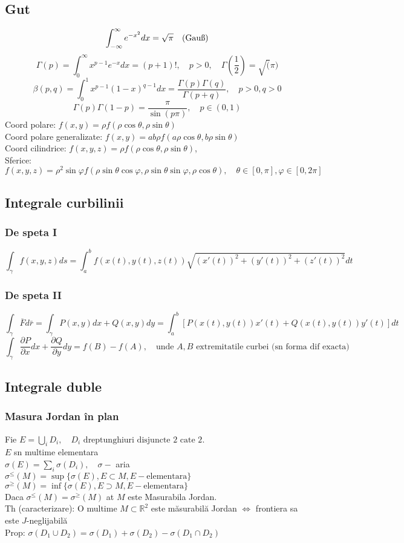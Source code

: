 \documentclass{article}
\newcommand{\parti}[2]{\frac{\partial #1}{ \partial #2}}
\newcommand*{\R}{\mathbb{R}}
\begin{document}
\subsection*{Gut}
\[ \int_{-\infty}^{\infty}e^{-x^2}dx = \sqrt{\pi} \text{\quad(Gauß)} \]
\[ \Gamma(p) = \int_0^{\infty} x^{p-1}e^{-x}dx = (p+1)!, \quad p > 0, \quad \Gamma(\frac{1}{2}) = \sqrt(\pi)  \]
\[ \beta(p, q) = \int_0^{1} x^{p-1}(1-x)^{q-1}dx = \frac{\Gamma(p)\Gamma(q)}{\Gamma(p+q)}, \quad p > 0, q > 0 \]
\[ \Gamma(p)\Gamma(1-p)= \frac{\pi}{\sin(p\pi)}, \quad p \in (0, 1) \]
Coord polare: $f(x,y) = \rho f(\rho \cos \theta, \rho \sin\theta)$ \\
Coord polare generalizate: $f(x,y) = ab\rho f(a\rho\cos\theta, b\rho\sin\theta) $\\
Coord cilindrice: $f(x, y, z) = \rho f(\rho\cos\theta, \rho\sin\theta)$, \\
Sferice: $f(x, y,z) = \rho^2\sin\varphi f(\rho \sin\theta\cos\varphi, \rho\sin\theta\sin\varphi, \rho\cos\theta),\quad \theta \in [0, \pi], \varphi \in[0, 2\pi]$
\subsection*{Integrale curbilinii}
\subsubsection*{De speta I}
\[ \int_{\gamma} f(x, y, z)ds = \int_a^bf(x(t), y(t), z(t)) \sqrt{(x'(t))^2+(y'(t))^2+(z'(t))^2} dt \]
\subsubsection*{De speta II}
\[ \int_{\gamma}\overline{F}d\bar{r} = \int_{\gamma} P(x,y) dx+ Q(x,y)dy = \int_a^b \left[P(x(t), y(t))x'(t) + Q(x(t), y(t)) y'(t) \right]dt \]
\[ \int_{\gamma} \parti{P}{x}dx+\parti{Q}{y}dy = f(B)- f(A), \quad \text{unde $A, B$ extremitatile curbei (sn forma dif exacta) } \]
\subsection*{Integrale duble}
\subsubsection*{Masura Jordan în plan}
Fie $E = \bigcup_i D_i, \quad D_i \text{ dreptunghiuri disjuncte 2 cate 2}$.\\
$E$ sn multime elementara\\
$\sigma(E) = \sum_i \sigma(D_i), \quad \sigma - $ aria\\
$\sigma^{\le}(M)=\sup\{\sigma(E), E \subset M, E -\text{elementara} \}$\\
$\sigma^{\ge}(M)=\inf\{\sigma(E), E \supset M, E -\text{elementara} \}$\\
Daca $\sigma^{\le}(M)=\sigma^{\ge}(M) $ at $M$ este Masurabila Jordan.\\
Th (caracterizare): O multime $M \subset \R^2$ este măsurabilă Jordan $\iff$ frontiera sa este $J$-neglijabilă\\
Prop: $\sigma(D_1\cup D_2) = \sigma(D_1) + \sigma(D_2) - \sigma(D_1\cap D_2)$
\end{document}
